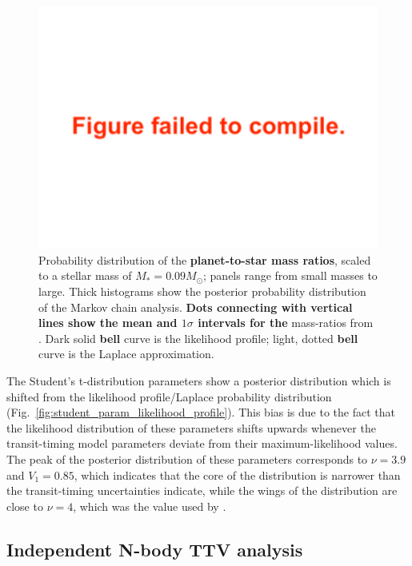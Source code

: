 \documentclass[twocolumn]{aastex63}
\begin{document}
\begin{figure}
    \centering
    \includegraphics[width=\hsize]{figures/T1_masses_03312020.pdf}
    {Probability distribution of the \textbf{planet-to-star mass ratios}, scaled to a stellar mass of $M_*  = 0.09 M_\odot$; panels range from small masses to large.   Thick
        histograms show the posterior probability distribution of the Markov chain analysis.
        \textbf{Dots connecting with vertical lines show the mean and $1\sigma$ intervals for the} mass-ratios from \citet{Grimm2018}.
        Dark solid \textbf{bell} curve is the likelihood profile; light, dotted \textbf{bell} curve is the Laplace approximation.}
    \label{fig:mass_likelihood_profile}
\end{figure}

The Student's t-distribution parameters show a posterior distribution which is shifted from the likelihood profile/Laplace probability distribution (Fig.\ \ref{fig:student_param_likelihood_profile}).  This bias is due to the fact that the likelihood distribution of these parameters shifts upwards whenever the transit-timing model parameters deviate from their maximum-likelihood values.  The peak of  the  posterior distribution of these parameters corresponds to
$\nu = 3.9$ and $V_1 = 0.85$, which indicates that the core of the distribution is narrower than the transit-timing uncertainties indicate, while the wings of the distribution are close to $\nu = 4$, which was the value used by
\citet{JontofHutter2016}.



\subsection{Independent N-body TTV analysis}
\end{document}
